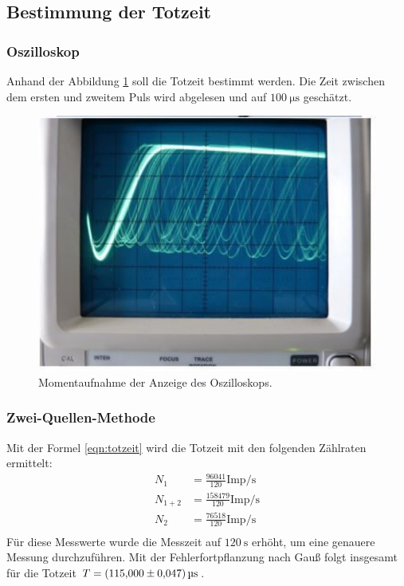 \subsection{Bestimmung der Totzeit}
\label{subsec:Totzeit}

\subsubsection{Oszilloskop}
Anhand der Abbildung \ref{fig:Momentaufnahme} soll die Totzeit bestimmt werden.
Die Zeit zwischen dem ersten und zweitem Puls wird abgelesen und auf $\SI{100}{\micro\second}$ geschätzt.

\begin{figure}
  \centering
  \includegraphics{Momentaufnahme.pdf}
  \caption{Momentaufnahme der Anzeige des Oszilloskops.\cite{anleitung}}
  \label{fig:Momentaufnahme}
\end{figure}

\subsubsection{Zwei-Quellen-Methode}
Mit der Formel \eqref{eqn:totzeit} wird die Totzeit mit den folgenden Zählraten ermittelt:
\begin{align*}
  N_1 &= \frac{96041}{120} \text{Imp/s} \\
  N_{1+2} &= \frac{158479}{120} \text{Imp/s} \\
  N_2 &= \frac{76518}{120} \text{Imp/s} \\
\end{align*}
Für diese Messwerte wurde die Messzeit auf $\SI{120}{\second}$ erhöht, um eine genauere Messung durchzuführen.
Mit der Fehlerfortpflanzung nach Gauß folgt insgesamt für die Totzeit $T = \SI{115 \pm 0.047}{\micro\second}$.

